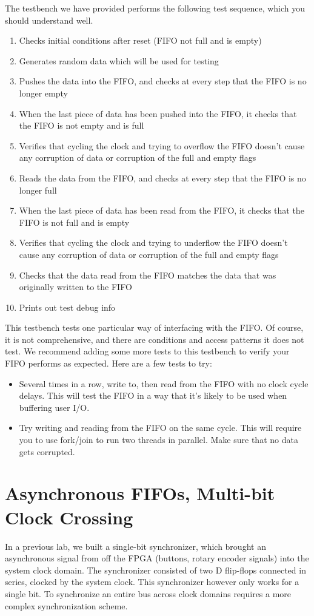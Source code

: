 \documentclass[11pt]{article}
\begin{document}
The testbench we have provided performs the following test sequence, which you should understand well.
\begin{enumerate}
	\item Checks initial conditions after reset (FIFO not full and is empty)
	\item Generates random data which will be used for testing
	\item Pushes the data into the FIFO, and checks at every step that the FIFO is no longer empty
	\item When the last piece of data has been pushed into the FIFO, it checks that the FIFO is not empty and is full
	\item Verifies that cycling the clock and trying to overflow the FIFO doesn't cause any corruption of data or corruption of the full and empty flags
	\item Reads the data from the FIFO, and checks at every step that the FIFO is no longer full
	\item When the last piece of data has been read from the FIFO, it checks that the FIFO is not full and is empty
	\item Verifies that cycling the clock and trying to underflow the FIFO doesn't cause any corruption of data or corruption of the full and empty flags
	\item Checks that the data read from the FIFO matches the data that was originally written to the FIFO
	\item Prints out test debug info
\end{enumerate}

This testbench tests one particular way of interfacing with the FIFO. Of course, it is not comprehensive, and there are conditions and access patterns it does not test. We recommend adding some more tests to this testbench to verify your FIFO performs as expected. Here are a few tests to try:

\begin{itemize}
	\item Several times in a row, write to, then read from the FIFO with no clock cycle delays. This will test the FIFO in a way that it's likely to be used when buffering user I/O.
	\item Try writing and reading from the FIFO on the same cycle. This will require you to use fork/join to run two threads in parallel. Make sure that no data gets corrupted.
\end{itemize}

\section{Asynchronous FIFOs, Multi-bit Clock Crossing}
In a previous lab, we built a single-bit synchronizer, which brought an asynchronous signal from off the FPGA (buttons, rotary encoder signals) into the system clock domain. The synchronizer consisted of two D flip-flops connected in series, clocked by the system clock. This synchronizer however only works for a single bit. To synchronize an entire bus across clock domains requires a more complex synchronization scheme.
\end{document}
